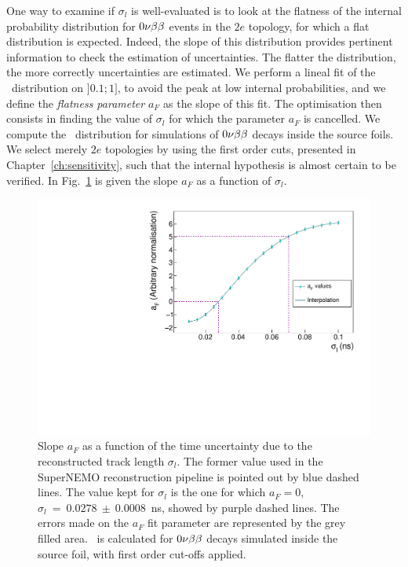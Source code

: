 One way to examine if $\sigma_{l}$ is well-evaluated is to look at the flatness of the internal probability distribution for $0\nu\beta\beta$ events in the $2e$ topology, for which a flat distribution is expected.
Indeed, the slope of this distribution provides pertinent information to check the estimation of uncertainties.
The flatter the distribution, the more correctly uncertainties are estimated.
We perform a lineal fit of the \Pint\ distribution on $]0.1;1]$, to avoid the peak at low internal probabilities, and we define the \emph{flatness parameter} $a_{F}$ as the slope of this fit.
The optimisation then consists in finding the value of $\sigma_{l}$ for which the parameter $a_{F}$ is cancelled.
We compute the \Pint\ distribution for simulations of $0\nu\beta\beta$ decays inside the source foils.
We select merely $2e$ topologies by using the first order cuts, presented in Chapter~\ref{ch:sensitivity}, such that the internal hypothesis is almost certain to be verified.
In Fig.~\ref{fig:flatness} is given the slope $a_{F}$ as a function of $\sigma_{l}$.
\begin{figure}
  \centering
  \includegraphics[width=13cm]{timedifference/fig_timediff/flatness.pdf}
  \caption{Slope $a_{F}$ as a function of the time uncertainty due to the reconstructed track length $\sigma_{l}$.
    The former value used in the SuperNEMO reconstruction pipeline is pointed out by blue dashed lines.
    The value kept for $\sigma_{l}$ is the one for which $a_{F}=0$, $\sigma_{l}~=~0.0278~\pm~0.0008$~ns, showed by purple dashed lines.
    The errors made on the $a_{F}$ fit parameter are represented by the grey filled area.
    \Pint\ is calculated for $0\nu\beta\beta$ decays simulated inside the source foil, with first order cut-offs applied.
    \label{fig:flatness}}
\end{figure}
